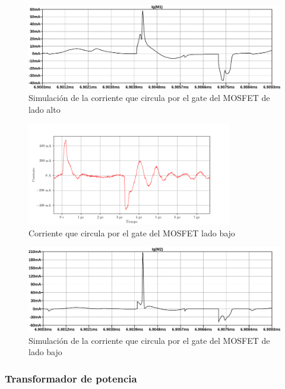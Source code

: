 \begin{figure}[H]
    \centering
    \includegraphics[width=\textwidth]{images/sim/8.pdf}
    \caption{Simulación de la corriente que circula por el gate del MOSFET de lado alto}
    \label{fig:sim:8}
\end{figure}
 
\begin{figure}[H]
    \centering
    \includegraphics[width=0.8\textwidth]{images/capturas-osciloscopio/17-11-2022/17.png}
    \caption{Corriente que circula por el gate del MOSFET lado bajo}
    \label{fig:osc:17}
\end{figure}

\begin{figure}[H]
    \centering
    \includegraphics[width=\textwidth]{images/sim/9.pdf}
    \caption{Simulación de la corriente que circula por el gate del MOSFET de lado bajo}
    \label{fig:sim:9}
\end{figure}

\subsubsection{Transformador de potencia}

